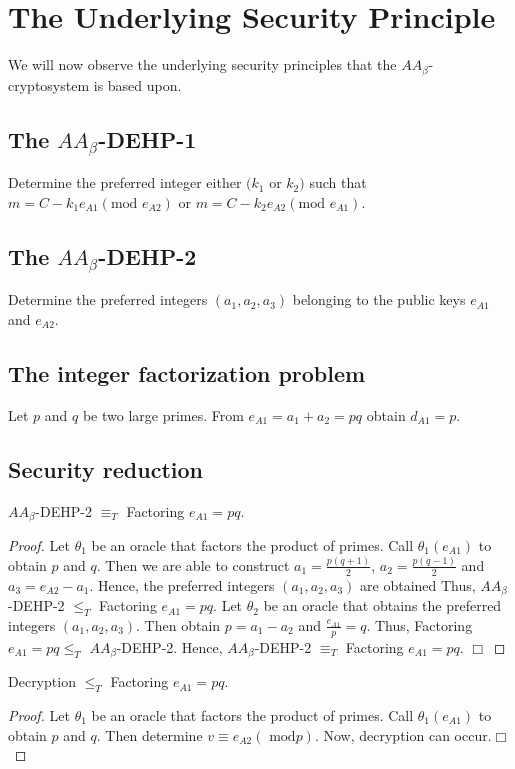 \documentclass{llncs}
\begin{document}
\section{The Underlying Security Principle}
We will now observe the underlying security principles that the
$AA_\beta$-cryptosystem is based upon.

\subsection{The $AA_\beta$-DEHP-1}
Determine the preferred integer either  $(k_{1}$ or $k_{2})$ such
that $m=C-k_{1}e_{A1} (\textrm{mod } e_{A2})$ or  $m=C-k_{2}e_{A2}
(\textrm{mod } e_{A1})$.

\subsection{The $AA_\beta$-DEHP-2}
Determine the preferred integers $(a_{1}, a_{2}, a_{3})$ belonging
to the public keys $e_{A1}$ and $e_{A2}$.

\subsection{The integer factorization problem}
Let $p$ and $q$ be two large primes. From $e_{A1}=a_{1} +
a_{2}=pq$ obtain $d_{A1}=p$.

\subsection{Security reduction}
\begin{proposition}
$AA_\beta$-DEHP-2 $\equiv_{T}$ Factoring $e_{A1}=pq$.
\end{proposition}
\begin{proof}
Let $\theta_{1}$ be an oracle that factors the product of primes.
Call $\theta_{1}(e_{A1})$ to obtain $p$ and $q$. Then we are able
to construct $a_{1}=\frac{p(q+1)}{2}$, $a_{2}=\frac{p(q-1)}{2}$
and $a_{3}=e_{A2}-a_{1}$. Hence, the preferred integers $(a_{1},
a_{2}, a_{3})$ are obtained Thus, $AA_\beta$-DEHP-2 $\leq_{T}$
Factoring $e_{A1}=pq$. Let $\theta_{2}$ be an oracle that obtains
the preferred integers $(a_{1}, a_{2}, a_{3})$. Then obtain
$p=a_{1}-a_{2}$ and $\frac{e_{A1}}{p}=q$. Thus, Factoring
$e_{A1}=pq \leq_{T}$ $AA_\beta$-DEHP-2. Hence, $AA_\beta$-DEHP-2
$\equiv_{T}$ Factoring $e_{A1}=pq$. $\Box$
\end{proof}

\begin{proposition}
Decryption $\leq_{T}$ Factoring $e_{A1}=pq$.
\end{proposition}
\begin{proof}
Let $\theta_{1}$ be an oracle that factors the product of primes.
Call $\theta_{1}(e_{A1})$ to obtain $p$ and $q$. Then determine
$v\equiv e_{A2} (\textrm { mod} p)$. Now, decryption can occur.$\Box$
\end{proof}
\end{document}
